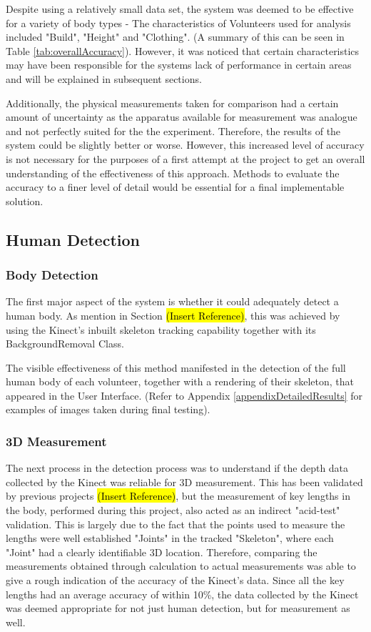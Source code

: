 Despite using a relatively small data set, the system was deemed to be effective for a variety of body types - The characteristics of Volunteers used for analysis included "Build", "Height" and "Clothing". (A summary of this can be seen in Table \ref{tab:overallAccuracy}). However, it was noticed that certain characteristics may have been responsible for the systems lack of performance in certain areas and will be explained in subsequent sections.

Additionally, the physical measurements taken for comparison had a certain amount of uncertainty as the apparatus available for measurement was analogue and not perfectly suited for the the experiment. Therefore, the results of the system could be slightly better or worse. However, this increased level of accuracy is not necessary for the purposes of a first attempt at the project to get an overall understanding of the effectiveness of this approach. Methods to evaluate the accuracy to a finer level of detail would be essential for a final implementable solution.

\subsection{Human Detection}

\subsubsection{Body Detection}
The first major aspect of the system is whether it could adequately detect a human body. As mention in Section \hl{(Insert Reference)}, this was achieved by using the Kinect's inbuilt skeleton tracking capability together with its BackgroundRemoval Class.

The visible effectiveness of this method manifested in the detection of the full human body of each volunteer, together with a rendering of their skeleton, that appeared in the User Interface. (Refer to Appendix \ref{appendixDetailedResults} for examples of images taken during final testing). 

\subsubsection{3D Measurement}
The next process in the detection process was to understand if the depth data collected by the Kinect was reliable for 3D measurement. This has been validated by previous projects \hl{(Insert Reference)}, but the measurement of key lengths in the body, performed during this project, also acted as an indirect "acid-test" validation. This is largely due to the fact that the points used to measure the lengths were well established "Joints" in the tracked "Skeleton", where each "Joint" had a clearly identifiable 3D location. Therefore, comparing the measurements obtained through calculation to actual measurements was able to give a rough indication of the accuracy of the Kinect's data. Since all the key lengths had an average accuracy of within 10\%, the data collected by the Kinect was deemed appropriate for not just human detection, but for measurement as well. 

